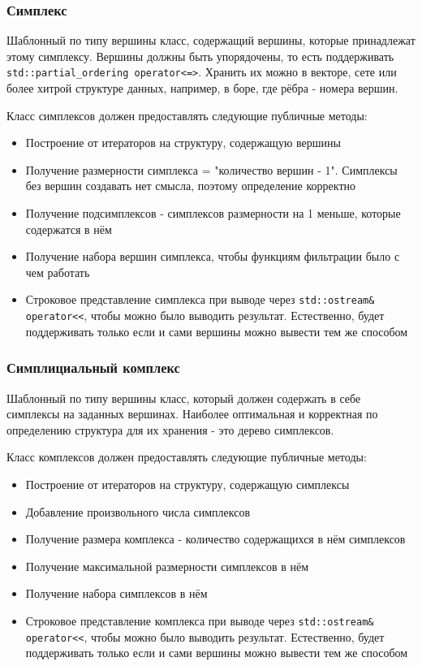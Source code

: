 \documentclass{article}
\begin{document}
\subsubsection{Симплекс}
Шаблонный по типу вершины класс, содержащий вершины, которые принадлежат этому симплексу. Вершины должны быть упорядочены, то есть поддерживать \verb"std::partial_ordering operator<=>". Хранить их можно в векторе, сете или более хитрой структуре данных, например, в боре, где рёбра - номера вершин.

Класс симплексов должен предоставлять следующие публичные методы:
\begin{itemize}
  \item Построение от итераторов на структуру, содержащую вершины
  \item Получение размерности симплекса = "количество вершин - 1". Симплексы без вершин создавать нет смысла, поэтому определение корректно
  \item Получение подсимплексов - симплексов размерности на 1 меньше, которые содержатся в нём
  \item Получение набора вершин симплекса, чтобы функциям фильтрации было с чем работать
  \item Строковое представление симплекса при выводе через \verb"std::ostream& operator<<", чтобы можно было выводить результат. Естественно, будет поддерживать только если и сами вершины можно вывести тем же способом
\end{itemize}
\subsubsection{Симплициальный комплекс}
Шаблонный по типу вершины класс, который должен содержать в себе симплексы на заданных вершинах. Наиболее оптимальная и корректная по определению структура для их хранения - это дерево симплексов.

Класс комплексов должен предоставлять следующие публичные методы:
\begin{itemize}
  \item Построение от итераторов на структуру, содержащую симплексы
  \item Добавление произвольного числа симплексов
  \item Получение размера комплекса - количество содержащихся в нём симплексов
  \item Получение максимальной размерности симплексов в нём
  \item Получение набора симплексов в нём
  \item Строковое представление комплекса при выводе через \verb"std::ostream& operator<<", чтобы можно было выводить результат. Естественно, будет поддерживать только если и сами вершины можно вывести тем же способом
\end{itemize}
\end{document}
